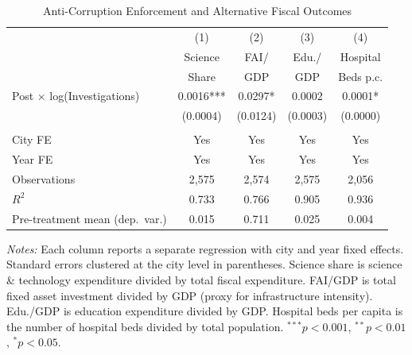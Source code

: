 \begin{table}[t]
\centering
\caption{Anti-Corruption Enforcement and Alternative Fiscal Outcomes}
\label{tab:secondary}
\small
\begin{tabular}{lcccc}
\hline\hline
    & (1) & (2) & (3) & (4) \\
    & Science & FAI/ & Edu./ & Hospital \\
    & Share & GDP & GDP & Beds p.c. \\
\hline
    Post $\times$ log(Investigations) & 0.0016*** & 0.0297* & 0.0002 & 0.0001* \\
    & (0.0004) & (0.0124) & (0.0003) & (0.0000) \\
    \\
    City FE & Yes & Yes & Yes & Yes \\
    Year FE & Yes & Yes & Yes & Yes \\
    Observations & 2,575 & 2,574 & 2,575 & 2,056 \\
    $R^2$ & 0.733 & 0.766 & 0.905 & 0.936 \\
    Pre-treatment mean (dep.~var.) & 0.015 & 0.711 & 0.025 & 0.004 \\
\hline\hline
\end{tabular}
\begin{tablenotes}
\item \textit{Notes:} Each column reports a separate regression with city and year fixed effects.
Standard errors clustered at the city level in parentheses.
Science share is science \& technology expenditure divided by total fiscal expenditure.
FAI/GDP is total fixed asset investment divided by GDP (proxy for infrastructure intensity).
Edu./GDP is education expenditure divided by GDP.
Hospital beds per capita is the number of hospital beds divided by total population.
$^{***}p<0.001$, $^{**}p<0.01$, $^{*}p<0.05$.
\end{tablenotes}
\end{table}

